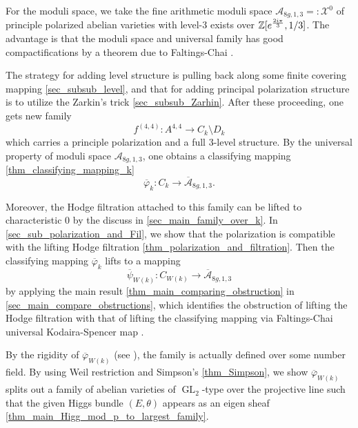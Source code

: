 \documentclass[12pt,twoside]{book}
\theoremstyle{plain}
\theoremstyle{definition}
\theoremstyle{remark}
\newcommand{\bZ}{{\mathbb Z}}
\newcommand{\mA}{{\mathcal A}}
\newcommand{\mX}{{\mathcal X}}
\DeclareMathOperator\GL{GL}
\numberwithin{equation}{section}
\begin{document}
For the moduli space, we take the fine arithmetic moduli space $\mA_{8g, 1, 3}=: \mX^0$ of principle polarized abelian varieties with level-3 exists over $\bZ[e^{{2i \pi \over 3}}, 1/3]$. The advantage is that the moduli space and universal family has good compactifications by a theorem due to Faltings-Chai \cite{FaCh90}.


The strategy for adding level structure is pulling back along some finite covering mapping \autoref{sec_subsub_level}, and that for adding principal polarization structure is to utilize the Zarkin's trick \autoref{sec_subsub_Zarhin}. After these proceeding, one gets new family
\[f^{(4,4)}\colon A^{4,4} \rightarrow C_k\setminus D_k\]
which carries a principle polarization and a full $3$-level structure. By the universal property of moduli space $\mA_{8g,1,3}$, one obtains a classifying mapping \autoref{thm_classifying_mapping_k}
\[\overline{\varphi}_k \colon C_k \rightarrow \overline{\mA}_{8g,1,3}.\]



Moreover, the Hodge filtration attached to this family can be lifted to characteristic $0$ by the discuss in \autoref{sec_main_family_over_k}. In \autoref{sec_sub_polarization_and_Fil}, we show that the polarization is compatible with the lifting Hodge filtration \autoref{thm_polarization_and_filtration}. Then the classifying mapping $\overline{\varphi}_k$ lifts to a mapping
\[\overline{\psi}_{W(k)} \colon C_{W(k)} \rightarrow \overline{\mA}_{8g,1,3}\]
by applying the main result \autoref{thm_main_comparing_obstruction} in \autoref{sec_main_compare_obstructions}, which identifies the obstruction of lifting the Hodge filtration with that of lifting the classifying mapping via Faltings-Chai universal Kodaira-Spencer map \cite{FaCh90}. 

By the rigidity of $\overline{\varphi}_{W(k)}$ (see \cite[Section 4]{KYZ22}), the family is actually defined over some number field. By using Weil restriction and Simpson's \autoref{thm_Simpson}, we show $\overline{\varphi}_{W(k)}$ splits out a family of abelian varieties of $\GL_2$-type over the projective line such that the given Higgs bundle $(E,\theta)$ appears as an eigen sheaf \autoref{thm_main_Higg_mod_p_to_largest_family}.
\end{document}
